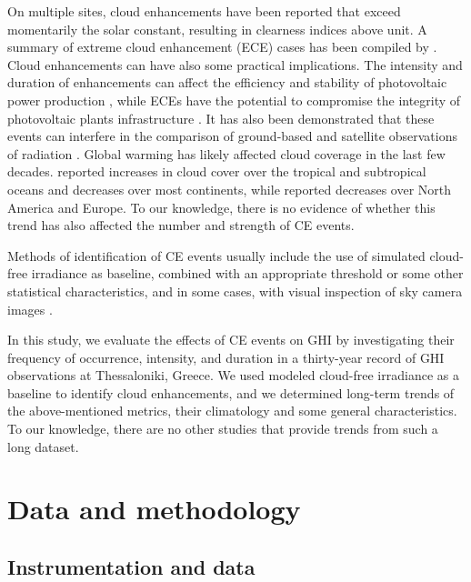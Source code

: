 \documentclass[preprint, 5p,
authoryear]{elsarticle} %
\begin{document}
On multiple sites, cloud enhancements have been reported that exceed
momentarily the solar constant, resulting in clearness indices above
unit. A summary of extreme cloud enhancement (ECE) cases has been
compiled by \citet{Martins2022}. Cloud enhancements can have also some
practical implications. The intensity and duration of enhancements can
affect the efficiency and stability of photovoltaic power production
\citep{Lappalainen2020, Jaervelae2020}, while ECEs have the potential to
compromise the integrity of photovoltaic plants infrastructure
\citep{DoNascimento2019}. It has also been demonstrated that these
events can interfere in the comparison of ground-based and satellite
observations of radiation \citep{Damiani2018}. Global warming has likely
affected cloud coverage in the last few decades. \citet{Liu2023}
reported increases in cloud cover over the tropical and subtropical
oceans and decreases over most continents, while \citet{Dong2023}
reported decreases over North America and Europe. To our knowledge,
there is no evidence of whether this trend has also affected the number
and strength of CE events.

Methods of identification of CE events usually include the use of
simulated cloud-free irradiance as baseline, combined with an
appropriate threshold or some other statistical characteristics, and in
some cases, with visual inspection of sky camera images \citep[ and
references therein]{Vamvakas2020, Mol2023}.

In this study, we evaluate the effects of CE events on GHI by
investigating their frequency of occurrence, intensity, and duration in
a thirty-year record of GHI observations at Thessaloniki, Greece. We
used modeled cloud-free irradiance as a baseline to identify cloud
enhancements, and we determined long-term trends of the above-mentioned
metrics, their climatology and some general characteristics. To our
knowledge, there are no other studies that provide trends from such a
long dataset.

\hypertarget{data-and-methodology}{%
\section{Data and methodology}\label{data-and-methodology}}

\hypertarget{instrumentation-and-data}{%
\subsection{Instrumentation and data}\label{instrumentation-and-data}}
\end{document}
